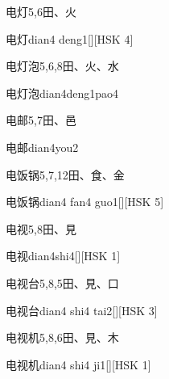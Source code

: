 \begin{entry}{电灯}{5,6}{⽥、⽕}
  \begin{phonetics}{电灯}{dian4 deng1}[][HSK 4]
  \end{phonetics}
\end{entry}

\begin{entry}{电灯泡}{5,6,8}{⽥、⽕、⽔}
  \begin{phonetics}{电灯泡}{dian4deng1pao4}
  \end{phonetics}
\end{entry}

\begin{entry}{电邮}{5,7}{⽥、⾢}
  \begin{phonetics}{电邮}{dian4you2}
  \end{phonetics}
\end{entry}

\begin{entry}{电饭锅}{5,7,12}{⽥、⾷、⾦}
  \begin{phonetics}{电饭锅}{dian4 fan4 guo1}[][HSK 5]
  \end{phonetics}
\end{entry}

\begin{entry}{电视}{5,8}{⽥、⾒}
  \begin{phonetics}{电视}{dian4shi4}[][HSK 1]
  \end{phonetics}
\end{entry}

\begin{entry}{电视台}{5,8,5}{⽥、⾒、⼝}
  \begin{phonetics}{电视台}{dian4 shi4 tai2}[][HSK 3]
  \end{phonetics}
\end{entry}

\begin{entry}{电视机}{5,8,6}{⽥、⾒、⽊}
  \begin{phonetics}{电视机}{dian4 shi4 ji1}[][HSK 1]
  \end{phonetics}
\end{entry}

